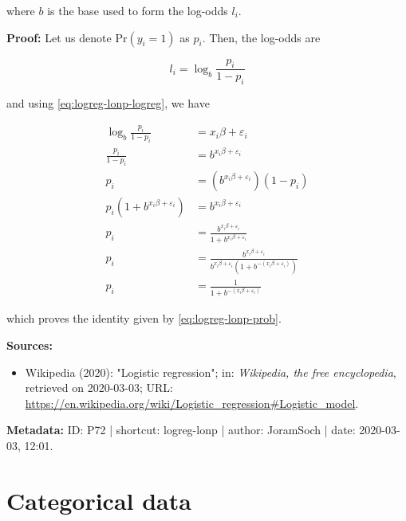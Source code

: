 \documentclass[a4paper,12pt,twoside]{book}
\begin{document}
where $b$ is the base used to form the log-odds $l_i$.


\vspace{1em}
\textbf{Proof:} Let us denote $\mathrm{Pr}(y_i = 1)$ as $p_i$. Then, the log-odds are

\begin{equation} \label{eq:logreg-lonp-lodds}
l_i = \log_b \frac{p_i}{1-p_i}
\end{equation}

and using \eqref{eq:logreg-lonp-logreg}, we have

\begin{equation} \label{eq:logreg-lonp-prob-qed}
\begin{split}
\log_b \frac{p_i}{1-p_i} &= x_i \beta + \varepsilon_i \\
\frac{p_i}{1-p_i} &= b^{x_i \beta + \varepsilon_i} \\
p_i &= \left( b^{x_i \beta + \varepsilon_i} \right) (1-p_i) \\
p_i \left( 1 + b^{x_i \beta + \varepsilon_i} \right) &= b^{x_i \beta + \varepsilon_i} \\
p_i &= \frac{b^{x_i \beta + \varepsilon_i}}{1 + b^{x_i \beta + \varepsilon_i}} \\
p_i &= \frac{b^{x_i \beta + \varepsilon_i}}{b^{x_i \beta + \varepsilon_i} \left( 1 + b^{-(x_i \beta + \varepsilon_i)} \right)} \\
p_i &= \frac{1}{1 + b^{-(x_i \beta + \varepsilon_i)}}
\end{split}
\end{equation}

which proves the identity given by \eqref{eq:logreg-lonp-prob}.


\vspace{1em}
\textbf{Sources:}
\begin{itemize}
\item Wikipedia (2020): "Logistic regression"; in: \textit{Wikipedia, the free encyclopedia}, retrieved on 2020-03-03; URL: \url{https://en.wikipedia.org/wiki/Logistic_regression#Logistic_model}.
\end{itemize}


\vspace{1em}
\textbf{Metadata:} ID: P72 | shortcut: logreg-lonp | author: JoramSoch | date: 2020-03-03, 12:01.
\vspace{1em}



\pagebreak
\section{Categorical data}
\end{document}

